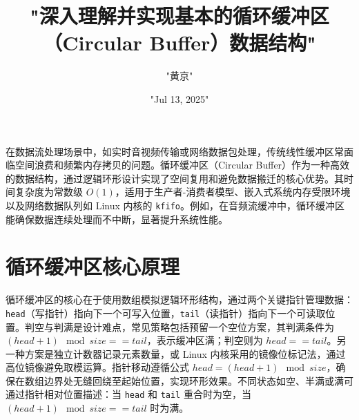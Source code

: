 \title{"深入理解并实现基本的循环缓冲区（Circular Buffer）数据结构"}
\author{"黄京"}
\date{"Jul 13, 2025"}
\maketitle
在数据流处理场景中，如实时音视频传输或网络数据包处理，传统线性缓冲区常面临空间浪费和频繁内存拷贝的问题。循环缓冲区（Circular Buffer）作为一种高效的数据结构，通过逻辑环形设计实现了空间复用和避免数据搬迁的核心优势。其时间复杂度为常数级 $O(1)$，适用于生产者-消费者模型、嵌入式系统内存受限环境以及网络数据队列如 Linux 内核的 \texttt{kfifo}。例如，在音频流缓冲中，循环缓冲区能确保数据连续处理而不中断，显著提升系统性能。\par
\chapter{循环缓冲区核心原理}
循环缓冲区的核心在于使用数组模拟逻辑环形结构，通过两个关键指针管理数据：\texttt{head}（写指针）指向下一个可写入位置，\texttt{tail}（读指针）指向下一个可读取位置。判空与判满是设计难点，常见策略包括预留一个空位方案，其判满条件为 $(head + 1) \mod size == tail$，表示缓冲区满；判空则为 $head == tail$。另一种方案是独立计数器记录元素数量，或 Linux 内核采用的镜像位标记法，通过高位镜像避免取模运算。指针移动遵循公式 $head = (head + 1) \mod size$，确保在数组边界处无缝回绕至起始位置，实现环形效果。不同状态如空、半满或满可通过指针相对位置描述：当 \texttt{head} 和 \texttt{tail} 重合时为空，当 $(head + 1) \mod size == tail$ 时为满。\par
